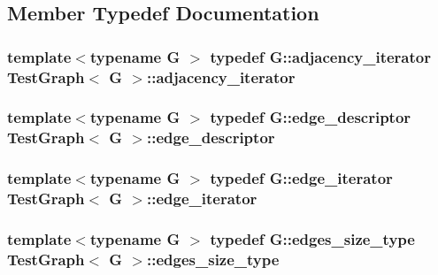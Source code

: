 \subsection{Member Typedef Documentation}
\hypertarget{structTestGraph_af50caf6f726568b4165d4a1dc5b75cc3}{
\subsubsection[{adjacency\-\_\-iterator}]{\setlength{\rightskip}{0pt plus 5cm}template$<$typename G $>$ typedef G\-::adjacency\-\_\-iterator {\bf Test\-Graph}$<$ G $>$\-::{\bf adjacency\-\_\-iterator}}}\label{structTestGraph_af50caf6f726568b4165d4a1dc5b75cc3}
\hypertarget{structTestGraph_aa20b87dd86a6d46d79cd5eead7e3ecd8}{
\subsubsection[{edge\-\_\-descriptor}]{\setlength{\rightskip}{0pt plus 5cm}template$<$typename G $>$ typedef G\-::edge\-\_\-descriptor {\bf Test\-Graph}$<$ G $>$\-::{\bf edge\-\_\-descriptor}}}\label{structTestGraph_aa20b87dd86a6d46d79cd5eead7e3ecd8}
\hypertarget{structTestGraph_a4a62a3acea29caad985cde5504e4222d}{
\subsubsection[{edge\-\_\-iterator}]{\setlength{\rightskip}{0pt plus 5cm}template$<$typename G $>$ typedef G\-::edge\-\_\-iterator {\bf Test\-Graph}$<$ G $>$\-::{\bf edge\-\_\-iterator}}}\label{structTestGraph_a4a62a3acea29caad985cde5504e4222d}
\hypertarget{structTestGraph_a308c6aa7034bf56790d592b0fc259851}{
\subsubsection[{edges\-\_\-size\-\_\-type}]{\setlength{\rightskip}{0pt plus 5cm}template$<$typename G $>$ typedef G\-::edges\-\_\-size\-\_\-type {\bf Test\-Graph}$<$ G $>$\-::{\bf edges\-\_\-size\-\_\-type}}}\label{structTestGraph_a308c6aa7034bf56790d592b0fc259851}
